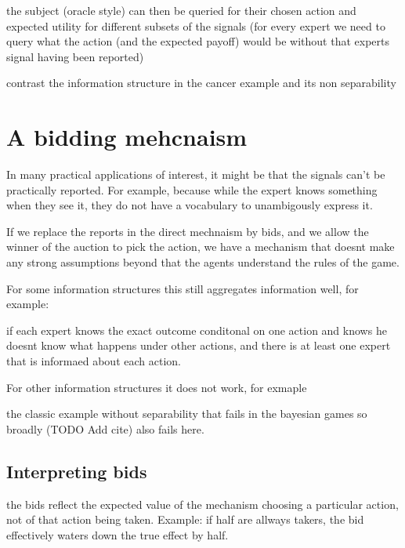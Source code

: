 \begin{thm}
the subject (oracle style) can then be queried for their chosen action and expected utility for different subsets of the signals (for every expert we need to query what the action (and the expected payoff) would be without that experts signal having been reported)

contrast the information structure in the cancer example and its non separability 


\section{A bidding mehcnaism }

In many practical applications of interest, it might be that the signals can't be practically reported. For example, because while the expert knows something when they see it, they do not have a vocabulary to unambigously express it. 


If we replace the reports in the direct mechnaism by bids, and we allow the winner of the auction to pick the action, we have a mechanism that doesnt make any strong assumptions beyond that the agents understand the rules of the game.

For some information structures this still aggregates information well, for example:

\begin{lem}
	if each expert knows the exact outcome conditonal on one action and knows he doesnt know what happens under other actions, and there is at least one expert that is informaed about each action.
\end{lem}

For other information structures it does not work, for exmaple 
\begin{eg}
	the classic example without separability that fails in the bayesian games so broadly (TODO Add cite) also fails here. 
\end{eg}


\subsection{Interpreting bids}

the bids reflect the expected value of the mechanism choosing a particular action, not of that action being taken.  Example: if half are allways takers, the bid effectively waters down the true effect by half.


\end{thm}
